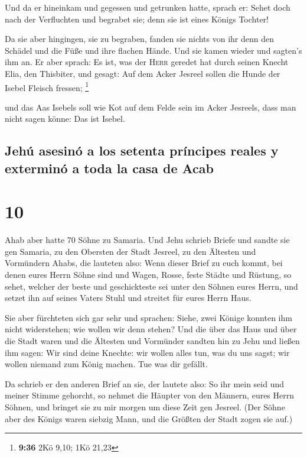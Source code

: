  Und da er hineinkam und gegessen und getrunken hatte,
sprach er: Sehet doch nach der Verfluchten und begrabet sie; denn sie
ist eines Königs Tochter!

 Da sie aber hingingen, sie zu begraben, fanden sie
nichts von ihr denn den Schädel und die Füße und ihre flachen Hände.
 Und sie kamen wieder und sagten's ihm an. Er aber
sprach: Es ist, was der \textsc{Herr} geredet hat durch seinen Knecht
Elia, den Thisbiter, und gesagt: Auf dem Acker Jesreel sollen die Hunde
der Isebel Fleisch fressen; \footnote{\textbf{9:36} 2Kö 9,10; 1Kö 21,23}

 und das Aas Isebels soll wie Kot auf dem Felde sein im
Acker Jesreels, dass man nicht sagen könne: Das ist Isebel.

\hypertarget{jehuxfa-asesinuxf3-a-los-setenta-pruxedncipes-reales-y-exterminuxf3-a-toda-la-casa-de-acab}{%
\subsection{Jehú asesinó a los setenta príncipes reales y exterminó a
toda la casa de
Acab}\label{jehuxfa-asesinuxf3-a-los-setenta-pruxedncipes-reales-y-exterminuxf3-a-toda-la-casa-de-acab}}

\hypertarget{section-9}{%
\section{10}\label{section-9}}

 Ahab aber hatte 70 Söhne zu Samaria. Und Jehu schrieb
Briefe und sandte sie gen Samaria, zu den Obersten der Stadt Jesreel, zu
den Ältesten und Vormündern Ahabs, die lauteten also: 
Wenn dieser Brief zu euch kommt, bei denen eures Herrn Söhne sind und
Wagen, Rosse, feste Städte und Rüstung,  so sehet, welcher
der beste und geschickteste sei unter den Söhnen eures Herrn, und setzet
ihn auf seines Vaters Stuhl und streitet für eures Herrn Haus.

 Sie aber fürchteten sich gar sehr und sprachen: Siehe,
zwei Könige konnten ihm nicht widerstehen; wie wollen wir denn stehen?
 Und die über das Haus und über die Stadt waren und die
Ältesten und Vormünder sandten hin zu Jehu und ließen ihm sagen: Wir
sind deine Knechte: wir wollen alles tun, was du uns sagst; wir wollen
niemand zum König machen. Tue was dir gefällt.

 Da schrieb er den anderen Brief an sie, der lautete also:
So ihr mein seid und meiner Stimme gehorcht, so nehmet die Häupter von
den Männern, eures Herrn Söhnen, und bringet sie zu mir morgen um diese
Zeit gen Jesreel. (Der Söhne aber des Königs waren siebzig Mann, und die
Größten der Stadt zogen sie auf.)

